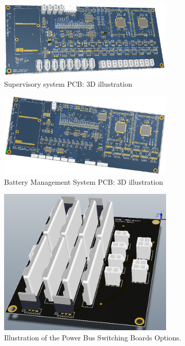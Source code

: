 \documentclass{ifacconf}
\begin{document}
\begin{figure}
\begin{center}
\includegraphics[width=8.4cm]{figs/SSPCB.png}    %
\caption{Supervisory system PCB: 3D illustration}
\label{fig:SSPCB}
\end{center}
\end{figure}
\begin{figure}
\begin{center}
\includegraphics[width=8.4cm]{figs/BMSPCB.png}    %
\caption{Battery Management System PCB: 3D illustration}
\label{fig:BMSPCB}
\end{center}
\end{figure}
\begin{figure}
\begin{center}
\includegraphics[width=8.4cm]{figs/Top2.png}    %
\caption{Illustration of the Power Bus Switching Boards Options.}
\label{fig:BMSSB}
\end{center}
\end{figure}
\end{document}
